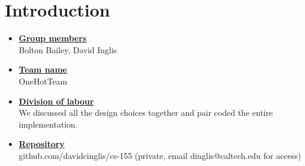 \newif\ifshowsolutions
\showsolutionstrue

\newcommand{\boldline}[1]{\underline{\textbf{#1}}}



\pagestyle{fancy}






\section{Introduction}
\medskip
\begin{itemize}

    \item \boldline{Group members} \\
    Bolton Bailey, David Inglis

    \item \boldline{Team name} \\
    OneHotTeam

    \item \boldline{Division of labour} \\
    We discussed all the design choices together and pair coded the entire
    implementation.

    \item \boldline{Repository} \\
    github.com/davidcinglis/cs-155 (private, email dinglis@caltech.edu for access)

\end{itemize}



